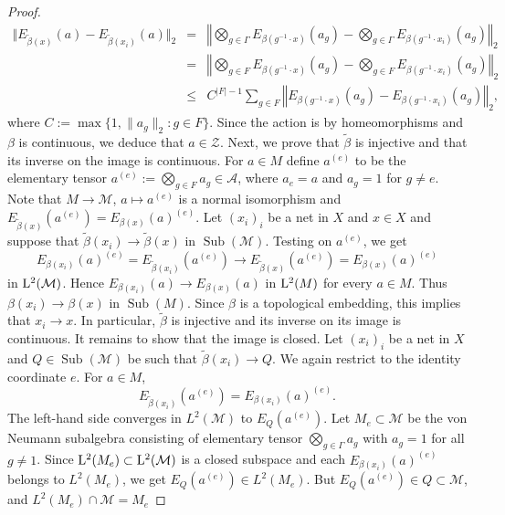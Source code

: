 \documentclass[12pt]{amsart} %
\theoremstyle{plain}
\theoremstyle{definition}
\DeclareMathOperator{\Sub}{Sub}
\begin{document}
\begin{proof}
\begin{eqnarray*}
\Vert E_{\widetilde\beta(x)}(a)-E_{\widetilde\beta(x_i)}(a)\Vert_2
&=& \left\Vert\bigotimes_{g\in \Gamma}E_{\beta(g^{-1}\cdot x)}(a_g)-\bigotimes_{g\in \Gamma}E_{\beta(g^{-1}\cdot x_i)}(a_g)\right\Vert_2\\
&=& \left\Vert\bigotimes_{g\in F}E_{\beta(g^{-1}\cdot x)}(a_g)-\bigotimes_{g\in F}E_{\beta(g^{-1}\cdot x_i)}(a_g)\right\Vert_2\\
&\leq& C^{\vert F\vert-1}\sum_{g\in F}\left\Vert E_{\beta(g^{-1}\cdot x)}(a_g)-E_{\beta(g^{-1}\cdot x_i)}(a_g)\right\Vert_2,
\end{eqnarray*}
where $C:=\max\{1,\|a_g\|_2:g\in F\}$. Since the action is by homeomorphisms and \(\beta\) is continuous, we deduce that $a\in\mathcal{Z}$.
\medskip
\noindent Next, we prove that \(\widetilde\beta\) is injective and that its inverse on the image
is continuous. For \(a\in M\) define $a^{(e)}$ to be the elementary tensor $a^{(e)}:=\bigotimes_{g\in F} a_g\in\mathcal{A}$, where $a_e=a$ and $a_g=1$ for $g\neq e$. Note that $M\rightarrow\mathcal{M}$, $a\mapsto a^{(e)}$ is a normal isomorphism and $E_{\widetilde\beta(x)}(a^{(e)})=E_{\beta(x)}(a)^{(e)}$. Let $(x_i)_i$ be a net in $X$ and $x\in X$ and suppose that $\widetilde\beta(x_i)\to \widetilde\beta(x)$ in $\Sub(\mathcal{M})$. Testing on \(a^{(e)}\), we get
\[
        E_{\beta(x_i)}(a)^{(e)}
        =
        E_{\widetilde\beta(x_i)}(a^{(e)})
        \to
        E_{\widetilde\beta(x)}(a^{(e)})
        =
        E_{\beta(x)}(a)^{(e)}
\]
in \({\rm L}^2(\mathcal M)\). Hence $E_{\beta(x_i)}(a)\to E_{\beta(x)}(a)$ in ${\rm L}^2(M)$ for every \(a\in M\). Thus $\beta(x_i)\to \beta(x)$ in $\Sub(M)$. Since \(\beta\) is a topological embedding, this implies that $ x_i\to x$. In particular, \(\widetilde\beta\) is injective and its inverse on its image is
continuous.
\medskip
\noindent It remains to show that the image is closed. Let $(x_i)_i$ be a net in $X$ and $Q\in\Sub(\mathcal M)$ be such that $\widetilde\beta(x_i)\to Q$. We again restrict to the identity coordinate \(e\). For \(a\in M\),
\[
        E_{\widetilde\beta(x_i)}(a^{(e)})
        =
        E_{\beta(x_i)}(a)^{(e)}.
\]
The left-hand side converges in \(L^2(\mathcal M)\) to \(E_Q(a^{(e)})\). Let $M_e\subset\mathcal{M}$ be the von Neumann subalgebra consisting of elementary tensor $\bigotimes_{g\in\Gamma}a_g$ with $a_g=1$ for all $g\neq 1$. Since ${\rm L}^2(M_e)\subset {\rm L}^2(\mathcal M)$ is a closed subspace and each \(E_{\beta(x_i)}(a)^{(e)}\) belongs to \(L^2(M_e)\),
we get $E_Q(a^{(e)})\in L^2(M_e)$. But \(E_Q(a^{(e)})\in Q\subset\mathcal M\), and $L^2(M_e)\cap \mathcal M = M_e$

\end{proof}
\end{document}
